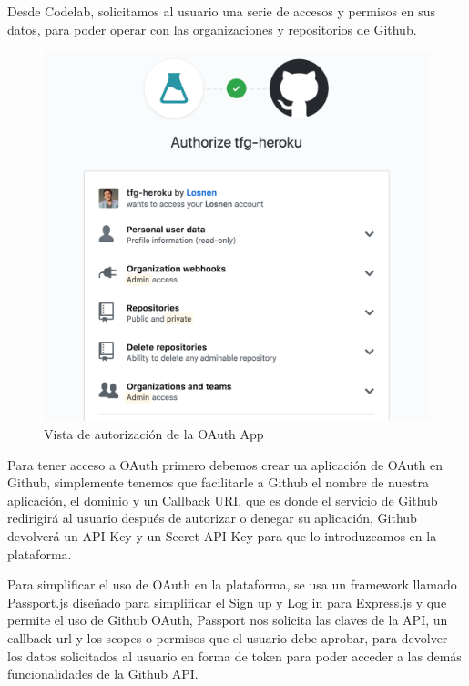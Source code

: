Desde Codelab, solicitamos al usuario una serie de accesos y permisos en sus datos, para poder operar con las organizaciones y repositorios de Github.

\begin{figure}[!th]
\begin{center}
\includegraphics[scale=0.5]{images/permisos}
\caption{Vista de autorización de la OAuth App}
\label{fig:Vista de la OAuth App}
\end{center}
\end{figure}

Para tener acceso a OAuth primero debemos crear ua aplicación de OAuth en Github, simplemente tenemos que facilitarle a Github el nombre de nuestra aplicación, el dominio y un Callback URI, que es donde el servicio de Github redirigirá al usuario después de autorizar o denegar su aplicación,
Github devolverá un API Key y un Secret API Key para que lo introduzcamos en la plataforma. 

Para simplificar el uso de OAuth en la plataforma, se usa un framework llamado Passport.js diseñado para simplificar el Sign up y Log in para Express.js y que permite el uso de Github OAuth, 
Passport nos solicita las claves de la API, un callback url y los scopes o permisos que el usuario debe aprobar, para devolver los datos solicitados al usuario en forma de token para poder acceder a las demás funcionalidades de la Github API.

